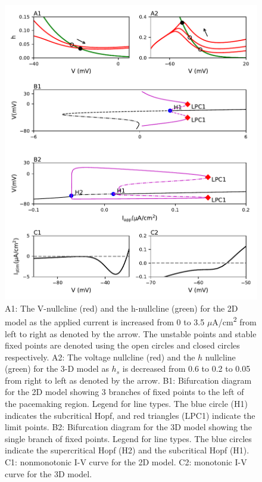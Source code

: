 \begin{figure}
	\centering
	\includegraphics[scale=0.7]{../figures/figure_4.pdf}
	\caption{A1: The V-nullcline (red) and the h-nullcline (green) for the 2D model as the applied current is increased from 0 to 3.5 $\mu$A/cm\textsuperscript{2} from left to right as denoted by the arrow. The unstable points and stable fixed points are denoted using the open circles and closed circles respectively. A2: The voltage nullcline (red) and the $h$ nullcline (green) for the 3-D model as $h_s$ is decreased from 0.6 to 0.2 to 0.05 from right to left as denoted by the arrow. B1: Bifurcation diagram for the 2D model showing 3 branches of fixed points to the left of the pacemaking region. Legend for line types. The blue circle (H1) indicates the subcritical Hopf, and red triangles (LPC1) indicate the limit points. B2: Bifurcation diagram for the 3D model showing the single branch of fixed points. Legend for line types. The blue circles indicate the supercritical Hopf (H2) and the subcritical Hopf (H1). C1: nonmonotonic I-V curve for the 2D model. C2: monotonic I-V curve for the 3D model.}
	\label{fig:4}
\end{figure}


